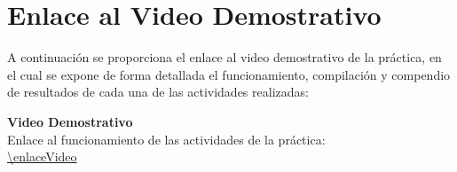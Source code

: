 
\section{Enlace al Video Demostrativo}

A continuación se proporciona el enlace al video demostrativo de la práctica, en el cual se expone de forma detallada el funcionamiento, compilación y compendio de resultados de cada una de las actividades realizadas:

\vspace{1.5cm}
\begin{center}
    \Large\textbf{Video Demostrativo} \\[0.5cm]
    \normalsize
    Enlace al funcionamiento de las actividades de la práctica: \\[0.3cm]
    \url{\enlaceVideo}
\end{center}
